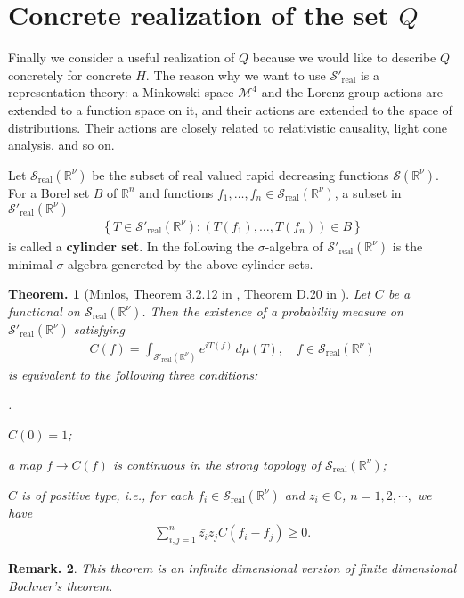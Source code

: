 \documentclass[openany, a4paper, oneside]{book}
\newcounter{enum2}
\renewenvironment{enumerate}{%
\begin{list}%
{%
\arabic{enum2}.\ \,%
}%
{%
\usecounter{enum2}
\setlength{\itemindent}{0pt}%
\setlength{\leftmargin}{6pt}%
\setlength{\rightmargin}{0pt}%
\setlength{\labelsep}{0pt}%
\setlength{\labelwidth}{6pt}%
\setlength{\itemsep}{0pt}%
\setlength{\parsep}{0pt}%
\setlength{\listparindent}{0pt}%
}
}{%
\end{list}%
}
\theoremstyle{break}
\newtheorem{thm}{Theorem.}[section]
\theoremstyle{breakdefn}
\newtheorem{rem}[thm]{Remark.}
\newcommand{\rbk}[1]{\left (#1\right)}
\newcommand{\set}[2]{\left\{#1 : #2\right\}}
\newcommand{\bbC}{\mathbb{C}}
\newcommand{\bbR}{\mathbb{R}}
\newcommand{\bbRnu}{\mathbb{R}^{\nu}}
\newcommand{\calM}{\mathcal{M}}
\newcommand{\calS}{\mathcal{S}}
\newcommand{\realtempereddist}{\mathcal{S}'_{\mathrm{real}}}
\newcommand{\realrapiddecrease}{\mathcal{S}_{\mathrm{real}}}
\begin{document}
\section{Concrete realization of the set $Q$}
\label{sec-8-2-3}

Finally we consider a useful realization of $Q$ because we would like to describe $Q$ concretely for concrete $H$.
The reason why we want to use $\realtempereddist$ is a representation theory:
a Minkowski space $\calM^4$ and the Lorenz group actions are extended to a function space on it,
and their actions are extended to the space of distributions.
Their actions are closely related to relativistic causality, light cone analysis, and so on.

Let $\realrapiddecrease (\bbRnu)$ be the subset of real valued rapid decreasing functions $\calS (\bbRnu)$.
For a Borel set $B$ of $\bbR^n$ and functions $f_1, \dots, f_n \in \realrapiddecrease (\bbRnu)$,
a subset in $\realtempereddist (\bbRnu)$
\begin{align}
 \set{ T \in \realtempereddist (\bbRnu)}{\rbk{T (f_1), \dots, T (f_n)} \in B}
\end{align}
is called a \textbf{cylinder set}.
In the following the $\sigma$-algebra of $\realtempereddist (\bbRnu)$ is the minimal $\sigma$-algebra
genereted by the above cylinder sets.

\begin{thm}[Minlos, Theorem 3.2.12 in \cite{AraiEzawa3}, Theorem D.20 in \cite{AsaoArai5}]
 Let $C$ be a functional on $\realrapiddecrease (\bbRnu)$.
 Then the existence of a probability measure on $\realtempereddist (\bbRnu)$ satisfying
 \begin{align}
  C (f)
  =
  \int_{\realtempereddist (\bbRnu)} e^{i T (f)} \, d \mu (T), \quad f \in \realrapiddecrease (\bbRnu)
 \end{align}
 is equivalent to the following three conditions:
\begin{enumerate}
\item $C (0) = 1$;
\item a map $f \to C (f)$ is continuous in the strong topology of $\realrapiddecrease (\bbRnu)$;
\item $C$ is of positive type, i.e., for each $f_i \in \realrapiddecrease (\bbRnu)$ and $z_i \in \bbC$, $n=1,2,\cdots,$ we have
    \begin{align}
     \sum_{i,j = 1}^{n} \bar{z_i} z_j C (f_i - f_j) \geq 0.
    \end{align}
\end{enumerate}
\end{thm}
\begin{rem}
 This theorem is an infinite dimensional version of finite dimensional Bochner's theorem.
\end{rem}
\end{document}
